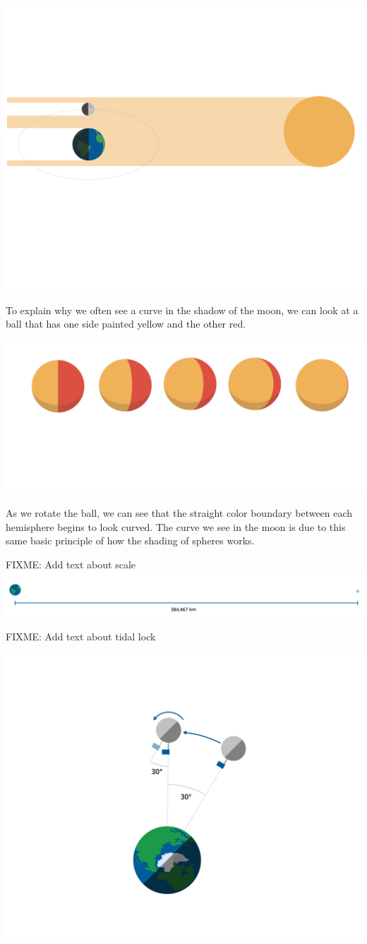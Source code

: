 \includegraphics[width=.7\textwidth]{moonspace.png}


To explain why we often see a curve in the shadow of the moon, we can look at a ball that has one side painted yellow and the other red. 

\includegraphics[width=.5\textwidth]{circleShading.png}

As we rotate the ball, we can see that the straight color boundary between each hemisphere begins to look curved. The curve we see in the moon is due to this same basic principle of how the shading of spheres works.    

FIXME: Add text about scale
\includegraphics[width=.7\textwidth]{moonEarthScale.png}


FIXME: Add text about tidal lock

\includegraphics[width=.7\textwidth]{moonRotate.png}

